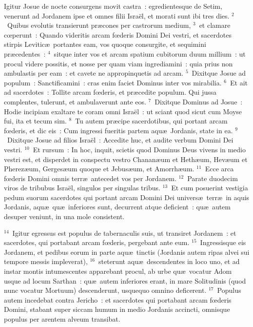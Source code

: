 \lettrine[lines=3,image=true,loversize=0.05,lraise=-0.03]{I}{}gitur Josue de nocte consurgens movit castra~: egredientesque de Setim, venerunt ad Jordanem ipse et omnes filii Isra\"el, et morati sunt ibi tres dies.
${}^{2}$~Quibus evolutis transierunt pr\ae cones per castrorum medium,
${}^{3}$~et clamare cœperunt~: Quando videritis arcam fœderis Domini Dei vestri, et sacerdotes stirpis Levitic\ae\ portantes eam, vos quoque consurgite, et sequimini pr\ae cedentes~:
${}^{4}$~sitque inter vos et arcam spatium cubitorum duum millium~: ut procul videre possitis, et nosse per quam viam ingrediamini~: quia prius non ambulastis per eam~: et cavete ne appropinquetis ad arcam.
${}^{5}$~Dixitque Josue ad populum~: Sanctificamini~: cras enim faciet Dominus inter vos mirabilia.
${}^{6}$~Et ait ad sacerdotes~: Tollite arcam fœderis, et pr\ae cedite populum. Qui jussa complentes, tulerunt, et ambulaverunt ante eos.
${}^{7}$~Dixitque Dominus ad Josue~: Hodie incipiam exaltare te coram omni Isra\"el~: ut sciant quod sicut cum Moyse fui, ita et tecum sim.
${}^{8}$~Tu autem pr\ae cipe sacerdotibus, qui portant arcam fœderis, et dic eis~: Cum ingressi fueritis partem aqu\ae\ Jordanis, state in ea.
${}^{9}$~Dixitque Josue ad filios Isra\"el~: Accedite huc, et audite verbum Domini Dei vestri.
${}^{10}$~Et rursum~: In hoc, inquit, scietis quod Dominus Deus vivens in medio vestri est, et disperdet in conspectu vestro Chanan\ae um et Heth\ae um, Hev\ae um et Pherez\ae um, Gerges\ae um quoque et Jebus\ae um, et Amorrh\ae um.
${}^{11}$~Ecce arca fœderis Domini omnis terr\ae\ antecedet vos per Jordanem.
${}^{12}$~Parate duodecim viros de tribubus Isra\"el, singulos per singulas tribus.
${}^{13}$~Et cum posuerint vestigia pedum suorum sacerdotes qui portant arcam Domini Dei univers\ae\ terr\ae\ in aquis Jordanis, aqu\ae\ qu\ae\ inferiores sunt, decurrent atque deficient~: qu\ae\ autem desuper veniunt, in una mole consistent.


${}^{14}$~Igitur egressus est populus de tabernaculis suis, ut transiret Jordanem~: et sacerdotes, qui portabant arcam fœderis, pergebant ante eum.
${}^{15}$~Ingressisque eis Jordanem, et pedibus eorum in parte aqu\ae\ tinctis (Jordanis autem ripas alvei sui tempore messis impleverat),
${}^{16}$~steterunt aqu\ae\ descendentes in loco uno, et ad instar montis intumescentes apparebant procul, ab urbe qu\ae\ vocatur Adom usque ad locum Sarthan~: qu\ae\ autem inferiores erant, in mare Solitudinis (quod nunc vocatur Mortuum) descenderunt, usquequo omnino deficerent.
${}^{17}$~Populus autem incedebat contra Jericho~: et sacerdotes qui portabant arcam fœderis Domini, stabant super siccam humum in medio Jordanis accincti, omnisque populus per arentem alveum transibat.

